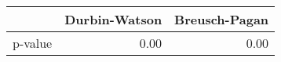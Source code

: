 \begin{table}[ht]
\centering
\begin{tabular}{rrr}
  \hline
 & Durbin-Watson & Breusch-Pagan \\ 
  \hline
p-value & 0.00 & 0.00 \\ 
   \hline
\end{tabular}
\end{table}
